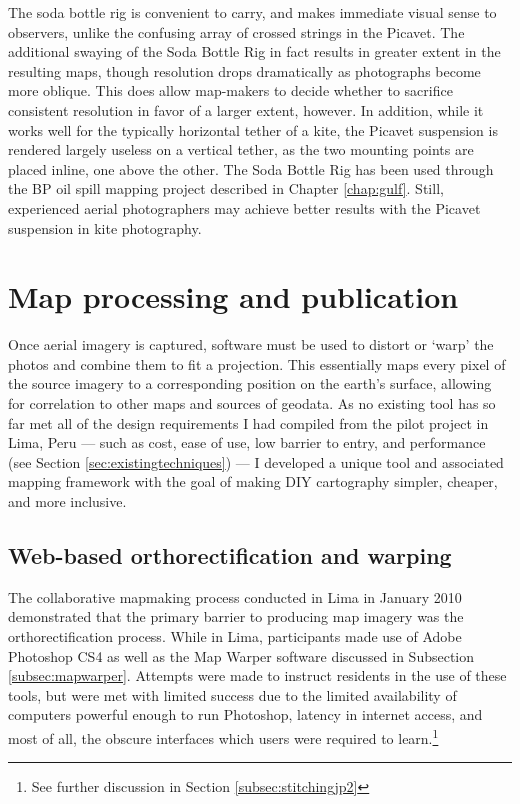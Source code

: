 \documentclass[11pt,oneside,notitlepage]{report}
\begin{document}
{{The soda bottle rig is convenient to carry, and makes immediate visual sense to observers, unlike the confusing array of crossed strings in the Picavet. The additional swaying of the Soda Bottle Rig in fact results in greater extent in the resulting maps, though resolution drops dramatically as photographs become more oblique. This does allow map-makers to decide whether to sacrifice consistent resolution in favor of a larger extent, however. In addition, while it works well for the typically horizontal tether of a kite, the Picavet suspension is rendered largely useless on a vertical tether, as the two mounting points are placed inline, one above the other. The Soda Bottle Rig has been used through the BP oil spill mapping project described in Chapter \ref{chap:gulf}. Still, experienced aerial photographers may achieve better results with the Picavet suspension in kite photography.  

\section{Map processing and publication}

Once aerial imagery is captured, software must be used to distort or `warp' the photos and combine them to fit a projection. This essentially maps every pixel of the source imagery to a corresponding position on the earth's surface, allowing for correlation to other maps and sources of geodata. As no existing tool has so far met all of the design requirements I had compiled from the pilot project in Lima, Peru --- such as cost, ease of use, low barrier to entry, and performance (see Section \ref{sec:existingtechniques}) --- I developed a unique tool and associated mapping framework with the goal of making DIY cartography simpler, cheaper, and more inclusive.

\subsection{Web-based orthorectification and warping}

The collaborative mapmaking process conducted in Lima in January 2010 demonstrated that the primary barrier to producing map imagery was the orthorectification process. While in Lima, participants made use of Adobe Photoshop CS4 as well as the Map Warper software discussed in Subsection \ref{subsec:mapwarper}. Attempts were made to instruct residents in the use of these tools, but were met with limited success due to the limited availability of computers powerful enough to run Photoshop, latency in internet access, and most of all, the obscure interfaces which users were required to learn.\footnote{See further discussion in Section \ref{subsec:stitchingjp2}} 

}}
\end{document}
